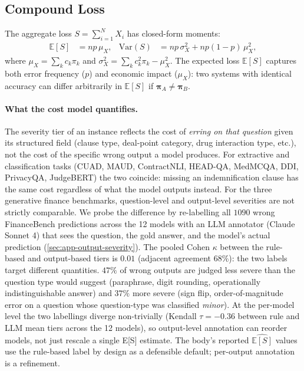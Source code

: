 \documentclass[11pt]{article}
\newcommand{\ES}{\mathbb{E}[S]}
\newcommand{\bpi}{\boldsymbol{\pi}}
\begin{document}
\subsection{Compound Loss}

The aggregate loss $S = \sum_{i=1}^{N} X_i$ has closed-form moments:
\begin{align}
  \ES &= n p \, \mu_X, &
  \mathrm{Var}(S) &= n p \, \sigma_X^2 + n p (1\!-\!p) \, \mu_X^2,
  \label{eq:expected_loss}
\end{align}
where $\mu_X = \sum_k c_k \pi_k$ and
$\sigma_X^2 = \sum_k c_k^2 \pi_k - \mu_X^2$. The expected loss
$\ES$ captures both error frequency ($p$) and economic impact
($\mu_X$): two systems with identical accuracy can differ arbitrarily
in $\ES$ if $\bpi_A \neq \bpi_B$.

\paragraph{What the cost model quantifies.}
The severity tier of an instance reflects the cost of
\emph{erring on that question} given its structured field (clause
type, deal-point category, drug interaction type, etc.), not the
cost of the specific wrong output a model produces. For
extractive and classification tasks (CUAD, MAUD, ContractNLI,
HEAD-QA, MedMCQA, DDI, PrivacyQA, JudgeBERT) the two coincide:
missing an indemnification clause has the same cost regardless
of what the model outputs instead. For the three generative
finance benchmarks, question-level and output-level severities
are not strictly comparable. We probe the difference by
re-labelling all $1090$ wrong FinanceBench predictions across
the 12 models with an LLM annotator (Claude Sonnet 4) that sees
the question, the gold answer, and the model's actual prediction
(\autoref{sec:app-output-severity}). The pooled Cohen $\kappa$
between the rule-based and output-based tiers is $0.01$
(adjacent agreement $68\%$): the two labels target different
quantities. $47\%$ of wrong outputs are judged less severe than the
question type would suggest (paraphrase, digit rounding,
operationally indistinguishable answer) and $37\%$ more severe
(sign flip, order-of-magnitude error on a question whose
question-type was classified \emph{minor}). At the per-model
level the two labellings diverge non-trivially (Kendall
$\tau = -0.36$ between rule and LLM mean tiers across the 12
models), so output-level annotation can reorder models, not
just rescale a single E[S] estimate. The body's reported
$\widehat{\ES}$ values use the rule-based label by design as a
defensible default; per-output annotation is a refinement.
\end{document}
